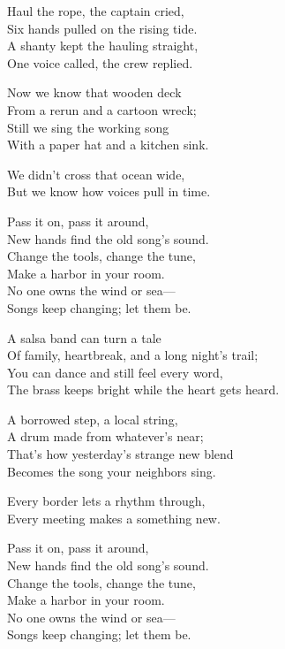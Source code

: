 \begin{lyrics}
Haul the rope, the captain cried,\\
Six hands pulled on the rising tide.\\
A shanty kept the hauling straight,\\
One voice called, the crew replied.

Now we know that wooden deck\\
From a rerun and a cartoon wreck;\\
Still we sing the working song\\
With a paper hat and a kitchen sink.

We didn’t cross that ocean wide,\\
But we know how voices pull in time.

Pass it on, pass it around,\\
New hands find the old song’s sound.\\
Change the tools, change the tune,\\
Make a harbor in your room.\\
No one owns the wind or sea—\\
Songs keep changing; let them be.

A salsa band can turn a tale\\
Of family, heartbreak, and a long night’s trail;\\
You can dance and still feel every word,\\
The brass keeps bright while the heart gets heard.

A borrowed step, a local string,\\
A drum made from whatever’s near;\\
That’s how yesterday’s strange new blend\\
Becomes the song your neighbors sing.

Every border lets a rhythm through,\\
Every meeting makes a something new.

Pass it on, pass it around,\\
New hands find the old song’s sound.\\
Change the tools, change the tune,\\
Make a harbor in your room.\\
No one owns the wind or sea—\\
Songs keep changing; let them be.


\end{lyrics}
